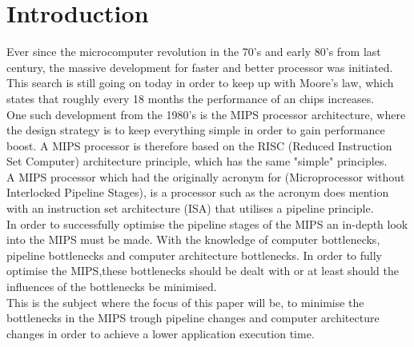 \documentclass[10pt]{article}
\begin{document}
\section{Introduction}
Ever since the microcomputer revolution in the 70's and early 80's from last century, the massive development for faster and better processor was initiated. This search is still going on today in order to keep up with Moore's law, which states that roughly every 18 months the performance of an chips increases.\\ 
One such development from the 1980's is the MIPS processor architecture, where the design strategy is to keep everything simple in order to gain performance boost. A MIPS processor is therefore based on the RISC (Reduced Instruction Set Computer) architecture principle, which has the same "simple" principles.\\
A MIPS processor which had the originally acronym for (Microprocessor without Interlocked Pipeline Stages), is a processor such as the acronym does mention with an instruction set architecture (ISA) that utilises a pipeline principle.\\
In order to successfully optimise the pipeline stages of the MIPS an in-depth look into the MIPS must be made. With the knowledge of computer bottlenecks, pipeline bottlenecks and computer architecture bottlenecks. In order to fully optimise the MIPS,these bottlenecks should be dealt with or at least should the influences of the bottlenecks be minimised.\\
This is the subject where the focus of this paper will be, to minimise the bottlenecks in the MIPS trough pipeline changes and computer architecture changes in order to achieve a lower application execution time. 
\end{document}
